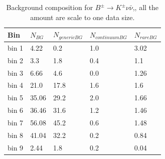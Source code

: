 \begin{table}[h]
\small
\begin{center}
\begin{tabu}to \textwidth{ |X[l]|X[c]|X[c]|X[c]|X[c]| }
\hline
 Bin & $N_{BG}$ &$N_{generic BG}$ & $N_{continuum BG}$ & $N_{rare BG}$   \\
 \hline
 bin 1  & 4.22  &0.2 &1.0&3.02\\ 
 \hline
 bin 2  & 3.3  &1.8 &0.4&1.1\\ 
 \hline
 bin 3  & 6.66  &4.6 &0.0&1.26\\ 
 \hline
 bin 4  & 21.0 	&17.8 &1.6&1.6 \\ 
 \hline
 bin 5  & 35.06  &29.2 &2.0&1.66 \\ 
 \hline
 bin 6  & 36.46 &31.6 &1.2&1.46 \\
 \hline
 bin 7  & 56.08 	&45.2 &0.6&1.48 \\ 
 \hline
  bin 8  & 41.04 	&32.2 &0.2&0.84 \\ 
 \hline
  bin 9  & 2.44 	&1.8 &0.2&0.04 \\ 
 \hline
 \hline
\end{tabu}
\caption{Background composition for $B^\pm \rightarrow K^\pm \nu \bar{\nu}$,, all the amount are scale to one data size.} \label{t:bgcomk}
\end{center}
\end{table}


